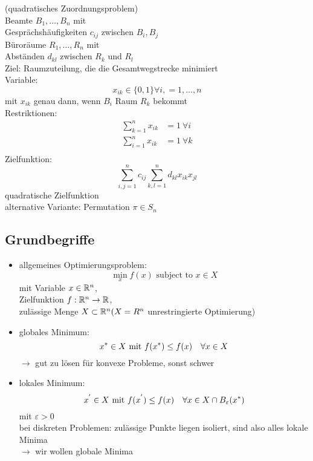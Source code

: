 \begin{beispiel}	
	(quadratisches Zuordnungsproblem)\\
	Beamte $B_{1},\dots,B_{n}$ mit \\
	Gesprächshäufigkeiten $c_{ij}$ zwischen $B_{i},B_{j}$ \\
	Büroräume $R_{1}, \dots, R_{n}$ mit \\
	Abständen $d_{kl}$ zwischen $R_{k}$ und $R_{l}$ \\
	Ziel: Raumzuteilung, die die Gesamtwegstrecke minimiert\\
	Variable:
	\begin{equation*}
		x_{ik} \in \{0,1\} \forall i,=1,\dots,n
	\end{equation*} 
	mit $x_{ik}$ genau dann, wenn $B_{i}$ Raum $R_{k}$ bekommt\\
	Restriktionen: 
	\begin{align*}
		\sum_{k=1}^{n} x_{ik} &=1 \ \forall i\\
		\sum_{i=1}^{n} x_{ik} &=1 \ \forall k\\
	\end{align*} 
	Zielfunktion: 
	\begin{equation*}
		\sum_{i,j=1}^{n} c_{ij}\sum_{k,l=1}^{n} d_{kl}x_{ik}x_{jl}
	\end{equation*} 
	quadratische Zielfunktion \\
	alternative Variante: Permutation $\pi \in S_{n}$
\end{beispiel}

\subsection{Grundbegriffe}
\begin{itemize}
	\item allgemeines Optimierungsproblem: 
		\begin{equation*}
			\min_{x} f(x) \text{ subject to } x\in X
		\end{equation*} 
		mit Variable $x \in \R^n$,\\
		Zielfunktion $f:\R^n \to \R$,\\
		zulässige Menge $X \subset \R^n (X = R^n$ unrestringierte Optimierung)
	\item globales Minimum: 
		\begin{equation*}
			x^* \in X \mit f(x^*)\leq f(x)\quad \forall x \in X
		\end{equation*} 
		$\to$ gut zu lösen für konvexe Probleme, sonst schwer
	\item lokales Minimum:
		\begin{equation*}
			x^{'} \in X \mit f(x^{'}) \leq f(x)\quad \forall x \in X \cap B_{\varepsilon}(x^*)
		\end{equation*} 
		mit $\varepsilon > 0$\\
		bei diskreten Problemen: zulässige Punkte liegen isoliert, sind also alles lokale Minima\\
		$\to$  wir wollen globale Minima
\end{itemize} 
